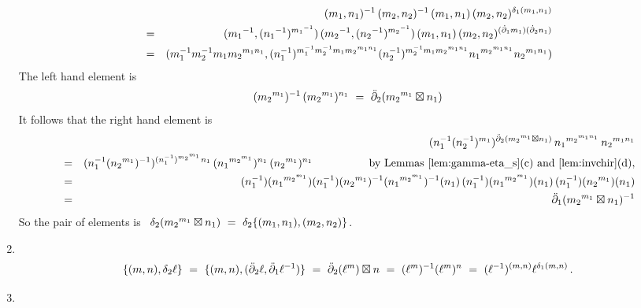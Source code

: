 \begin{pf}
\begin{enumerate}[{\bf 2X1:}]
\vspace*{-12mm}
\begin{eqnarray*}
  &   &  (m_1,n_1)^{-1}\,(m_2,n_2)^{-1}\,
          (m_1,n_1)\,(m_2,n_2)^{\delta_1(m_1,n_1)} \\
  & = &  ({m_1}^{-1},({n_1}^{-1})^{{m_1}^{-1}})\,
          ({m_2}^{-1},({n_2}^{-1})^{{m_2}^{-1}})\,
           (m_1,n_1)\,
            (m_2,n_2)^{(\dot{\partial}_1 m_1)(\dot{\partial}_2 n_1)} \\
  & = &  (m_1^{-1}m_2^{-1}m_1{m_2}^{m_1n_1},
          (n_1^{-1})^{m_1^{-1}m_2^{-1}m_1{m_2}^{m_1n_1}}
           (n_2^{-1})^{m_2^{-1}m_1{m_2}^{m_1n_1}}
            {n_1}^{{m_2}^{m_1n_1}}
             {n_2}^{m_1n_1} ) 
\end{eqnarray*}
The left hand element is
$$
({m_2}^{m_1})^{-1}\, ({m_2}^{m_1})^{n_1}
  ~=~  \ddot{\partial}_2({m_2}^{m_1} \boxtimes n_1)
$$
It follows that the right hand element is
\begin{eqnarray*}
  &   &  (n_1^{-1}(n_2^{-1})^{m_1})^{\ddbdyt({m_2}^{m_1} \bt n_1)}\,
          {n_1}^{{m_2}^{m_1n_1}}\,
           {n_2}^{m_1n_1} \\
  & = &  (n_1^{-1}({n_2}^{m_1})^{-1})^{(n_1^{-1})^{{m_2}^{m_1}}n_1}\,
          ({n_1}^{{m_2}^{m_1}})^{n_1}\,
           ({n_2}^{m_1})^{n_1} 
         \hspace{18mm} 
         \mbox{by Lemmas \ref{lem:gamma-eta_s}(c) and \ref{lem:invchir}(d)}, \\
  & = &  (n_1^{-1}) ({n_1}^{{m_2}^{m_1}}) (n_1^{-1}) ({n_2}^{m_1})^{-1} 
          ({n_1}^{{m_2}^{m_1}})^{-1} (n_1)\,
           (n_1^{-1}) ({n_1}^{{m_2}^{m_1}}) (n_1)\,
            (n_1^{-1}) ({n_2}^{m_1}) (n_1) \\
  & = &  \ddbdyo({m_2}^{m_1} \bt n_1)^{-1} 
\end{eqnarray*}
So the pair of elements is 
~$\delta_2({m_2}^{m_1} \boxtimes n_1) ~=~ \delta_2\{(m_1,n_1),(m_2,n_2)\}$.
\item~
$$
\{(m,n),\delta_2\ell\}
  ~ = ~  \{(m,n),(\ddot{\partial}_2\ell,\ddot{\partial}_1\ell^{-1})\} 
  ~ = ~  \ddot{\partial}_2(\ell^m) \boxtimes n
  ~ = ~  (\ell^m)^{-1}(\ell^m)^n
  ~ = ~  (\ell^{-1})^{(m,n)} \ell^{\delta_1(m,n)}\,.
$$
\item~


\end{enumerate}
\end{pf}
